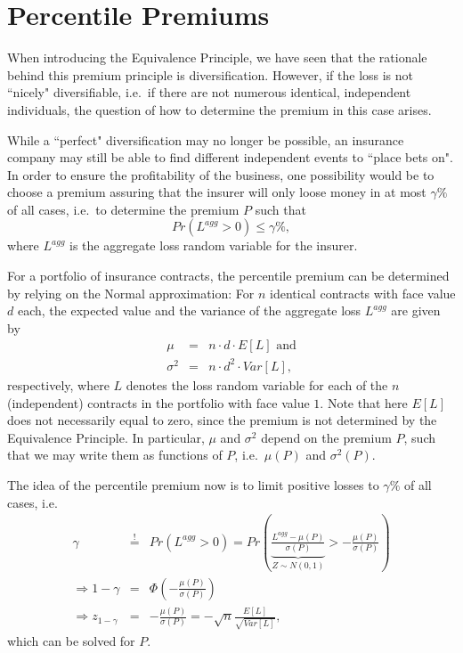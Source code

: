 \documentclass[11pt,fleqn,oneside]{book}
\begin{document}
\section{Percentile Premiums}
When introducing the Equivalence Principle, we have seen that the rationale behind this premium principle is diversification. However, if the loss is not ``nicely" diversifiable, i.e.\ if there are not numerous identical, independent individuals, the question of how to determine the premium in this case arises.

While a ``perfect" diversification may no longer be possible, an insurance company may still be able to find different independent events to ``place bets on". In order to ensure the profitability of the business, one possibility would be to choose a premium assuring that the insurer will only loose money in at most $\gamma\%$ of all cases, i.e.\ to determine the premium $P$ such that 
$$
Pr\left(L^{agg}>0\right) \leq \gamma \%,
$$
where $L^{agg}$ is the aggregate loss random variable for the insurer.

For a portfolio of insurance contracts, the percentile premium can be determined by relying on the Normal approximation: For $n$ identical contracts with face value $d$ each, the expected value and the variance of the aggregate loss $L^{agg}$ are given by
\begin{eqnarray*}
\mu &=& n \cdot d \cdot E[L] \text{ and}\\
\sigma^2 &=& n \cdot d^2 \cdot Var[L],
\end{eqnarray*}
respectively, where $L$ denotes the loss random variable for each of the $n$ (independent) contracts in the portfolio with face value $1$. Note that here $E[L]$ does not necessarily equal to zero, since the premium is not determined by the Equivalence Principle. In particular, $\mu$ and $\sigma^2$ depend on the premium $P$, such that we may write them as functions of $P$, i.e.\ $\mu(P)$ and $\sigma^2(P)$.

The idea of the percentile premium now is to limit positive losses to $\gamma \%$ of all cases, i.e.
\begin{eqnarray*}
\gamma &\stackrel{!}{=}& Pr(L^{agg} > 0) = Pr\left(\underbrace{\frac{L^{agg} - \mu(P)}{\sigma(P)}}_{Z \sim N(0,1)} > -\frac{\mu(P)}{\sigma(P)} \right)\\
\Rightarrow 1-\gamma &=& \Phi\left(-\frac{\mu(P)}{\sigma(P)} \right)\\
\Rightarrow z_{1-\gamma} &=& -\frac{\mu(P)}{\sigma(P)} = - \sqrt{n} \frac{E[L]}{\sqrt{Var[L]}},
\end{eqnarray*}
which can be solved for $P$.
\end{document}
